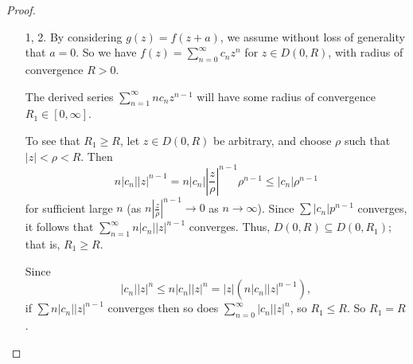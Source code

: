 \begin{proof}
    \begin{enumerate}
        \item[1, 2.] By considering \(g(z) = f(z+a)\), we assume without loss of generality that \(a = 0\). So we have \(f(z) = \sum\limits_{n=0}^{\infty} c_{n}z^n\) for \(z \in D(0,R)\), with radius of convergence \(R > 0\).

        The derived series \(\sum\limits_{n=1}^{\infty} nc_n z^{n-1}\) will have some radius of convergence \(R_1 \in [0,\infty]\).

        To see that \(R_1 \geq  R\), let \(z \in D(0,R)\) be arbitrary, and choose \(\rho\) such that \(\left\vert z \right\vert <\rho<R\). Then
        \[
            n\left\vert c_n \right\vert \left\vert z \right\vert ^{n-1}=n\left\vert c_n \right\vert \left\vert \frac{z}{\rho} \right\vert^{n-1}\rho^{n-1}\leq \left\vert c_n \right\vert \rho^{n-1}
        \]
        for sufficient large \(n\) (as \(n\left\vert \frac{z}{\rho} \right\vert^{n-1}\to 0 \) as \(n \to \infty\)). Since \(\sum \left\vert c_n \right\vert p^{n-1}\) converges, it follows that \(\sum\limits_{n=1}^{\infty} n\left\vert c_n \right\vert \left\vert z \right\vert ^{n-1}\) converges. Thus, \(D(0,R) \subseteq D(0,R_1)\); that is, \(R_1 \geq R\).

        Since
        \[
            \left\vert c_n \right\vert \left\vert z \right\vert ^n\leq n \left\vert c_n \right\vert \left\vert z \right\vert ^n = \left\vert z \right\vert (n\left\vert c_n \right\vert \left\vert z \right\vert ^{n-1}),
        \]
        if \(\sum n \left\vert c_n \right\vert \left\vert z \right\vert ^{n-1}\) converges then so does \(\sum\limits_{n=0}^{\infty} \left\vert c_n \right\vert \left\vert z \right\vert ^n\), so \(R_1\leq R\). So \(R_1 = R\).


\end{enumerate}
\end{proof}
